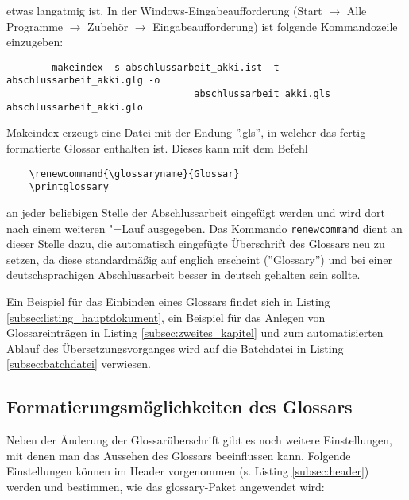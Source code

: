 etwas langatmig ist. In der Windows-Eingabeaufforderung (Start $\rightarrow$ Alle Programme
$\rightarrow$ Zubehör $\rightarrow$ Eingabeaufforderung) ist folgende Kommandozeile einzugeben:
\begin{verbatim}
		makeindex -s abschlussarbeit_akki.ist -t abschlussarbeit_akki.glg -o
								 abschlussarbeit_akki.gls abschlussarbeit_akki.glo
\end{verbatim}
Makeindex erzeugt eine Datei mit der Endung ''.gls'', in welcher das fertig formatierte Glossar
enthalten ist. Dieses kann mit dem Befehl
\begin{verbatim}
	\renewcommand{\glossaryname}{Glossar}
	\printglossary
\end{verbatim}
an jeder beliebigen Stelle der Abschlussarbeit eingefügt werden und wird dort nach einem weiteren
\DMLLaTeX"=Lauf ausgegeben. Das Kommando \texttt{renewcommand} dient an dieser Stelle dazu, die
automatisch eingefügte Überschrift des Glossars neu zu setzen, da diese standardmäßig auf
englich erscheint (''Glossary'') und bei einer deutschsprachigen Abschlussarbeit besser in deutsch
gehalten sein sollte.

Ein Beispiel für das Einbinden eines Glossars findet sich in Listing
\ref{subsec:listing_hauptdokument}, ein Beispiel für das Anlegen von Glossareinträgen in Listing
\ref{subsec:zweites_kapitel} und zum automatisierten Ablauf des Übersetzungsvorganges wird auf
die Batchdatei in Listing \ref{subsec:batchdatei} verwiesen.

\subsection{Formatierungsmöglichkeiten des Glossars}
Neben der Änderung der Glossarüberschrift gibt es noch weitere Einstellungen, mit denen man das
Aussehen des Glossars beeinflussen kann. Folgende Einstellungen können im Header vorgenommen
(s. Listing \ref{subsec:header}) werden und bestimmen, wie das glossary-Paket angewendet wird:

